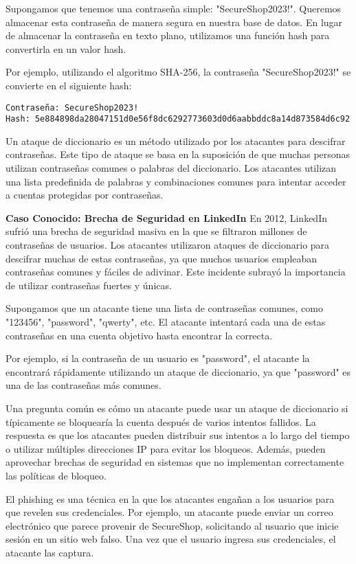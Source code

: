 Supongamos que tenemos una contraseña simple: "SecureShop2023!". Queremos almacenar esta contraseña de manera segura en nuestra base de datos. En lugar de almacenar la contraseña en texto plano, utilizamos una función hash para convertirla en un valor hash.

Por ejemplo, utilizando el algoritmo SHA-256, la contraseña "SecureShop2023!" se convierte en el siguiente hash:

\begin{verbatim}
Contraseña: SecureShop2023!
Hash: 5e884898da28047151d0e56f8dc6292773603d0d6aabbddc8a14d873584d6c92
\end{verbatim}  

Un ataque de diccionario es un método utilizado por los atacantes para descifrar contraseñas. Este tipo de ataque se basa en la suposición de que muchas personas utilizan contraseñas comunes o palabras del diccionario. Los atacantes utilizan una lista predefinida de palabras y combinaciones comunes para intentar acceder a cuentas protegidas por contraseñas.

\textbf{Caso Conocido: Brecha de Seguridad en LinkedIn}
En 2012, LinkedIn sufrió una brecha de seguridad masiva en la que se filtraron millones de contraseñas de usuarios. Los atacantes utilizaron ataques de diccionario para descifrar muchas de estas contraseñas, ya que muchos usuarios empleaban contraseñas comunes y fáciles de adivinar. Este incidente subrayó la importancia de utilizar contraseñas fuertes y únicas.


Supongamos que un atacante tiene una lista de contraseñas comunes, como "123456", "password", "qwerty", etc. El atacante intentará cada una de estas contraseñas en una cuenta objetivo hasta encontrar la correcta.

Por ejemplo, si la contraseña de un usuario es "password", el atacante la encontrará rápidamente utilizando un ataque de diccionario, ya que "password" es una de las contraseñas más comunes.



Una pregunta común es cómo un atacante puede usar un ataque de diccionario si típicamente se bloquearía la cuenta después de varios intentos fallidos. La respuesta es que los atacantes pueden distribuir sus intentos a lo largo del tiempo o utilizar múltiples direcciones IP para evitar los bloqueos. Además, pueden aprovechar brechas de seguridad en sistemas que no implementan correctamente las políticas de bloqueo.



El phishing es una técnica en la que los atacantes engañan a los usuarios para que revelen sus credenciales. Por ejemplo, un atacante puede enviar un correo electrónico que parece provenir de SecureShop, solicitando al usuario que inicie sesión en un sitio web falso. Una vez que el usuario ingresa sus credenciales, el atacante las captura.

